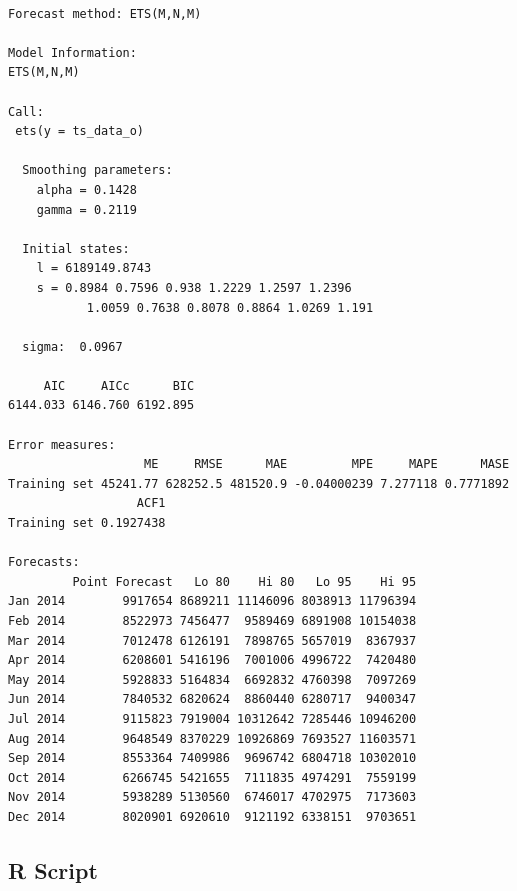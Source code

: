 \documentclass[openany]{book}
\begin{document}
\begin{verbatim}

Forecast method: ETS(M,N,M)

Model Information:
ETS(M,N,M) 

Call:
 ets(y = ts_data_o) 

  Smoothing parameters:
    alpha = 0.1428 
    gamma = 0.2119 

  Initial states:
    l = 6189149.8743 
    s = 0.8984 0.7596 0.938 1.2229 1.2597 1.2396
           1.0059 0.7638 0.8078 0.8864 1.0269 1.191

  sigma:  0.0967

     AIC     AICc      BIC 
6144.033 6146.760 6192.895 

Error measures:
                   ME     RMSE      MAE         MPE     MAPE      MASE
Training set 45241.77 628252.5 481520.9 -0.04000239 7.277118 0.7771892
                  ACF1
Training set 0.1927438

Forecasts:
         Point Forecast   Lo 80    Hi 80   Lo 95    Hi 95
Jan 2014        9917654 8689211 11146096 8038913 11796394
Feb 2014        8522973 7456477  9589469 6891908 10154038
Mar 2014        7012478 6126191  7898765 5657019  8367937
Apr 2014        6208601 5416196  7001006 4996722  7420480
May 2014        5928833 5164834  6692832 4760398  7097269
Jun 2014        7840532 6820624  8860440 6280717  9400347
Jul 2014        9115823 7919004 10312642 7285446 10946200
Aug 2014        9648549 8370229 10926869 7693527 11603571
Sep 2014        8553364 7409986  9696742 6804718 10302010
Oct 2014        6266745 5421655  7111835 4974291  7559199
Nov 2014        5938289 5130560  6746017 4702975  7173603
Dec 2014        8020901 6920610  9121192 6338151  9703651
\end{verbatim}

\hypertarget{script-b}{%
\subsection*{R Script}\label{script-b}}
\end{document}
